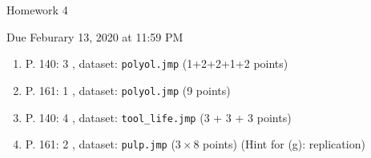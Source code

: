 \documentclass{article}
\begin{document}
\begin{center} \LARGE
Homework 4
\end{center}
\begin{center} \Large
Due Feburary 13, 2020 at 11:59 PM 
\end{center}



\begin{enumerate}
	\item P. 140: 3 , dataset: {\tt polyol.jmp} (1+2+2+1+2 points)
	\item P. 161: 1 , dataset: {\tt polyol.jmp} (9 points)
	\item P. 140: 4 , dataset: {\tt tool\_life.jmp} (3 + 3 + 3 points)
	\item P. 161: 2 , dataset: {\tt pulp.jmp} ($3 \times 8$ points) (Hint for (g): replication)
\end{enumerate}
% 
%
\end{document}
